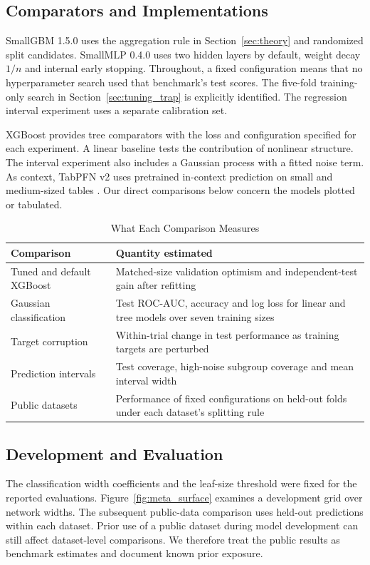 \documentclass[journal]{IEEEtran}
\begin{document}
\subsection{Comparators and Implementations}
SmallGBM 1.5.0 uses the aggregation rule in Section~\ref{sec:theory} and randomized split candidates. SmallMLP 0.4.0 uses two hidden layers by default, weight decay $1/n$ and internal early stopping. Throughout, a fixed configuration means that no hyperparameter search used that benchmark's test scores. The five-fold training-only search in Section~\ref{sec:tuning_trap} is explicitly identified. The regression interval experiment uses a separate calibration set.

XGBoost provides tree comparators with the loss and configuration specified for each experiment. A linear baseline tests the contribution of nonlinear structure. The interval experiment also includes a Gaussian process with a fitted noise term. As context, TabPFN v2 uses pretrained in-context prediction on small and medium-sized tables \cite{hollmann2025tabpfn}. Our direct comparisons below concern the models plotted or tabulated.

\begin{table}[!t]
\centering
\caption{What Each Comparison Measures}\label{tab:baselines}
\footnotesize
\begin{tabular}{@{}p{}p{}@{}}\toprule
Comparison & Quantity estimated \\\midrule
Tuned and default XGBoost & Matched-size validation optimism and independent-test gain after refitting \\
Gaussian classification & Test ROC-AUC, accuracy and log loss for linear and tree models over seven training sizes \\
Target corruption & Within-trial change in test performance as training targets are perturbed \\
Prediction intervals & Test coverage, high-noise subgroup coverage and mean interval width \\
Public datasets & Performance of fixed configurations on held-out folds under each dataset's splitting rule \\
\bottomrule\end{tabular}
\end{table}

\subsection{Development and Evaluation}\label{sec:meta_protocol}
The classification width coefficients and the leaf-size threshold were fixed for the reported evaluations. Figure~\ref{fig:meta_surface} examines a development grid over network widths. The subsequent public-data comparison uses held-out predictions within each dataset. Prior use of a public dataset during model development can still affect dataset-level comparisons. We therefore treat the public results as benchmark estimates and document known prior exposure.
\end{document}
